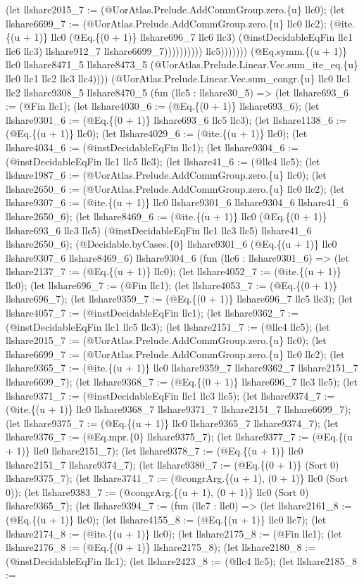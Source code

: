 \documentclass[11pt]{article}
\begin{document}
(let llshare2015\_7 := (@UorAtlas.Prelude.AddCommGroup.zero.\{u\} llc0); (let llshare6699\_7 := (@UorAtlas.Prelude.AddCommGroup.zero.\{u\} llc0 llc2); (@ite.\{(u + 1)\} llc0 (@Eq.\{(0 + 1)\} llshare696\_7 llc6 llc3) (@instDecidableEqFin llc1 llc6 llc3) llshare912\_7 llshare6699\_7)))))))))) llc5))))))) (@Eq.symm.\{(u + 1)\} llc0 llshare8471\_5 llshare8473\_5 (@UorAtlas.Prelude.Linear.Vec.sum\_ite\_eq.\{u\} llc0 llc1 llc2 llc3 llc4)))) (@UorAtlas.Prelude.Linear.Vec.sum\_congr.\{u\} llc0 llc1 llc2 llshare9308\_5 llshare8470\_5 (fun (llc5 : llshare30\_5) => (let llshare693\_6 := (@Fin llc1); (let llshare4030\_6 := (@Eq.\{(0 + 1)\} llshare693\_6); (let llshare9301\_6 := (@Eq.\{(0 + 1)\} llshare693\_6 llc5 llc3); (let llshare1138\_6 := (@Eq.\{(u + 1)\} llc0); (let llshare4029\_6 := (@ite.\{(u + 1)\} llc0); (let llshare4034\_6 := (@instDecidableEqFin llc1); (let llshare9304\_6 := (@instDecidableEqFin llc1 llc5 llc3); (let llshare41\_6 := (@llc4 llc5); (let llshare1987\_6 := (@UorAtlas.Prelude.AddCommGroup.zero.\{u\} llc0); (let llshare2650\_6 := (@UorAtlas.Prelude.AddCommGroup.zero.\{u\} llc0 llc2); (let llshare9307\_6 := (@ite.\{(u + 1)\} llc0 llshare9301\_6 llshare9304\_6 llshare41\_6 llshare2650\_6); (let llshare8469\_6 := (@ite.\{(u + 1)\} llc0 (@Eq.\{(0 + 1)\} llshare693\_6 llc3 llc5) (@instDecidableEqFin llc1 llc3 llc5) llshare41\_6 llshare2650\_6); (@Decidable.byCases.\{0\} llshare9301\_6 (@Eq.\{(u + 1)\} llc0 llshare9307\_6 llshare8469\_6) llshare9304\_6 (fun (llc6 : llshare9301\_6) => (let llshare2137\_7 := (@Eq.\{(u + 1)\} llc0); (let llshare4052\_7 := (@ite.\{(u + 1)\} llc0); (let llshare696\_7 := (@Fin llc1); (let llshare4053\_7 := (@Eq.\{(0 + 1)\} llshare696\_7); (let llshare9359\_7 := (@Eq.\{(0 + 1)\} llshare696\_7 llc5 llc3); (let llshare4057\_7 := (@instDecidableEqFin llc1); (let llshare9362\_7 := (@instDecidableEqFin llc1 llc5 llc3); (let llshare2151\_7 := (@llc4 llc5); (let llshare2015\_7 := (@UorAtlas.Prelude.AddCommGroup.zero.\{u\} llc0); (let llshare6699\_7 := (@UorAtlas.Prelude.AddCommGroup.zero.\{u\} llc0 llc2); (let llshare9365\_7 := (@ite.\{(u + 1)\} llc0 llshare9359\_7 llshare9362\_7 llshare2151\_7 llshare6699\_7); (let llshare9368\_7 := (@Eq.\{(0 + 1)\} llshare696\_7 llc3 llc5); (let llshare9371\_7 := (@instDecidableEqFin llc1 llc3 llc5); (let llshare9374\_7 := (@ite.\{(u + 1)\} llc0 llshare9368\_7 llshare9371\_7 llshare2151\_7 llshare6699\_7); (let llshare9375\_7 := (@Eq.\{(u + 1)\} llc0 llshare9365\_7 llshare9374\_7); (let llshare9376\_7 := (@Eq.mpr.\{0\} llshare9375\_7); (let llshare9377\_7 := (@Eq.\{(u + 1)\} llc0 llshare2151\_7); (let llshare9378\_7 := (@Eq.\{(u + 1)\} llc0 llshare2151\_7 llshare9374\_7); (let llshare9380\_7 := (@Eq.\{(0 + 1)\} (Sort 0) llshare9375\_7); (let llshare3741\_7 := (@congrArg.\{(u + 1), (0 + 1)\} llc0 (Sort 0)); (let llshare9383\_7 := (@congrArg.\{(u + 1), (0 + 1)\} llc0 (Sort 0) llshare9365\_7); (let llshare9394\_7 := (fun (llc7 : llc0) => (let llshare2161\_8 := (@Eq.\{(u + 1)\} llc0); (let llshare4155\_8 := (@Eq.\{(u + 1)\} llc0 llc7); (let llshare2174\_8 := (@ite.\{(u + 1)\} llc0); (let llshare2175\_8 := (@Fin llc1); (let llshare2176\_8 := (@Eq.\{(0 + 1)\} llshare2175\_8); (let llshare2180\_8 := (@instDecidableEqFin llc1); (let llshare2423\_8 := (@llc4 llc5); (let llshare2185\_8 := 
\end{document}
